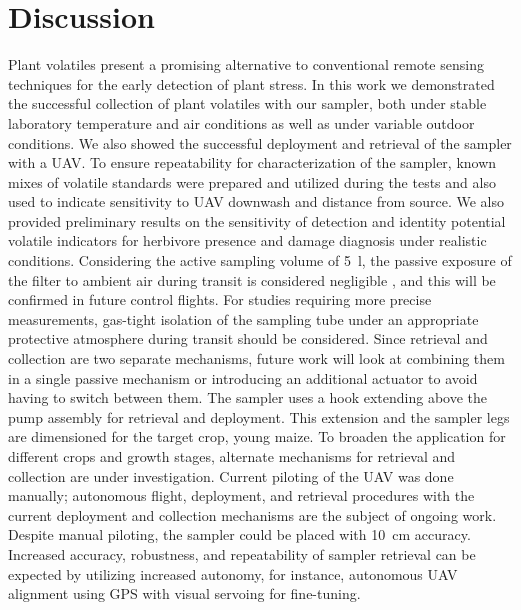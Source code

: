 \section{Discussion}
Plant volatiles present a promising alternative to conventional remote sensing techniques for the early detection of plant stress. In this work we demonstrated the successful collection of plant volatiles with our sampler, both under stable laboratory temperature and air conditions as well as under variable outdoor conditions. We also showed the successful deployment and retrieval of the sampler with a UAV. To ensure repeatability for characterization of the sampler, known mixes of volatile standards were prepared and utilized during the tests and also used to indicate sensitivity to UAV downwash and distance from source. We also provided preliminary results on the sensitivity of detection and identity potential volatile indicators for herbivore presence and damage diagnosis under realistic conditions. Considering the active sampling volume of 5~l, the passive exposure of the filter to ambient air during transit is considered negligible \cite{mckinney_sampler_2019}, and this will be confirmed in future control flights. For studies requiring more precise measurements, gas-tight isolation of the sampling tube under an appropriate protective atmosphere during transit should be considered.
Since retrieval and collection are two separate mechanisms, future work will look at combining them in a single passive mechanism or introducing an additional actuator to avoid having to switch between them.
The sampler uses a hook extending above the pump assembly for retrieval and deployment. This extension and the sampler legs are dimensioned for the target crop, young maize. To broaden the application for different crops and growth stages, alternate mechanisms for retrieval and collection are under investigation. 
Current piloting of the UAV was done manually; autonomous flight, deployment, and retrieval procedures with the current deployment and collection mechanisms are the subject of ongoing work. Despite manual piloting, the sampler could be placed with 10~cm accuracy. Increased accuracy, robustness, and repeatability of sampler retrieval can be expected by utilizing increased autonomy, for instance, autonomous UAV alignment using GPS with visual servoing for fine-tuning.

